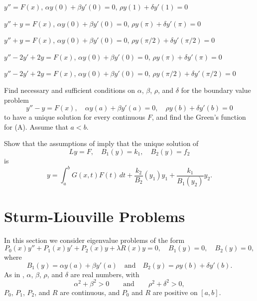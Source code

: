 \begin{exerciselist}

\item\label{exer:13.1.26}$y''=F(x)$, \quad $\alpha y(0)+\beta y'(0)=0$, \quad
$\rho y(1)+\delta y'(1)=0$

\item\label{exer:13.1.27}$y''+y=F(x)$, \quad $\alpha y(0)+\beta y'(0)=0$, \quad
$\rho y(\pi)+\delta y'(\pi)=0$

\item\label{exer:13.1.28}$y''+y=F(x)$, \quad $\alpha y(0)+\beta y'(0)=0$, \quad
$\rho y(\pi/2)+\delta y'(\pi/2)=0$

\item\label{exer:13.1.29}$y''-2y'+2y=F(x)$, \quad $\alpha y(0)+\beta y'(0)=0$, \quad
$\rho y(\pi)+\delta y'(\pi)=0$

\item\label{exer:13.1.30}$y''-2y'+2y=F(x)$, \quad $\alpha y(0)+\beta y'(0)=0$, \quad
$\rho y(\pi/2)+\delta y'(\pi/2)=0$

\item\label{exer:13.1.31}Find
necessary and sufficient conditions on $\alpha$, $\beta$, $\rho$,
and $\delta$ for the boundary value
 problem
\[
y''-y=F(x), \quad \alpha y(a)+\beta y'(a)=0, \quad
\rho y(b)+\delta y'(b)=0   \tag{A}
\]
to have a  unique solution for every continuous $F$, and find the Green's
function for (A). Assume that $a<b$.

\item\label{exer:13.1.32}Show that  the assumptions of  imply that the unique
solution of
\[
Ly=F, \quad  B_{1}(y)=k_{1},\quad B_{2}(y)=f_{2}
\]
is
\[
y=\int_{a}^{b} G(x,t)F(t)\,dt +\frac{k_{2}}{B_{2}}(y_{1})y_{1}
+\frac{k_{1}}{B_{1}(y_{2})}y_{2}.
\]
\end{exerciselist}


\section{Sturm-Liouville Problems}\label{sec:sturm_liouville}

In this section we consider eigenvalue problems of  the form
\begin{equation} \label{eq:13.2.1}
P_{0}(x)y''+P_{1}(x)y'+P_{2}(x)y+ \lambda R(x)y=0,\quad B_{1}(y)=0,\quad
B_{2}(y)=0,
\end{equation}
where
\[
B_{1}(y)=\alpha y(a)+\beta y'(a) \quad\text{and}\quad
B_{2}(y)=\rho y(b)+\delta y'(b).
\]
As in ,  $\alpha$, $\beta$, $\rho$, and $\delta$
are real numbers, with
\[
\alpha^{2}+\beta^{2}>0\qquad\text{and}\qquad\rho^{2}+\delta^{2}>0,
\]
$P_{0}$, $P_{1}$, $P_{2}$, and $R$ are continuous, and $P_{0}$ and $R$
are positive on $[a,b]$.





